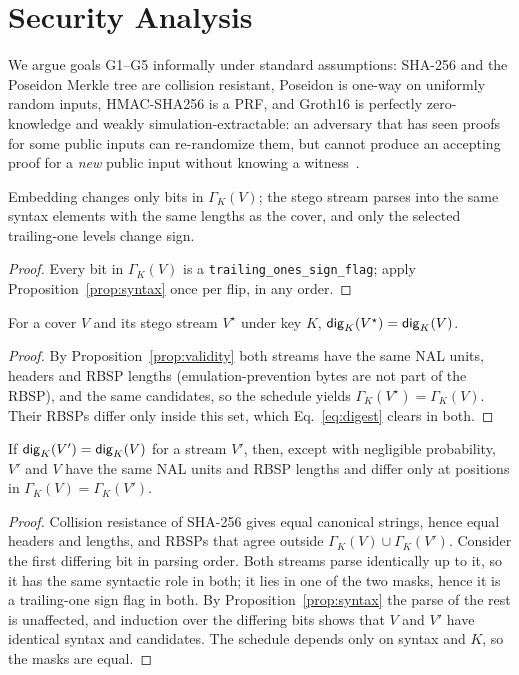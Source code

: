 \section{Security Analysis}
\label{sec:security}

We argue goals G1--G5 informally under standard assumptions: SHA-256 and the Poseidon Merkle tree are collision resistant, Poseidon is one-way on uniformly random inputs, HMAC-SHA256 is a PRF, and Groth16 is perfectly zero-knowledge and weakly simulation-extractable: an adversary that has seen proofs for some public inputs can re-randomize them, but cannot produce an accepting proof for a \emph{new} public input without knowing a witness~\cite{baghery2021groth16}.

\begin{proposition}[Validity, G1]
\label{prop:validity}
Embedding changes only bits in $\Gamma_K(V)$; the stego stream parses into the same syntax elements with the same lengths as the cover, and only the selected trailing-one levels change sign.
\end{proposition}
\begin{proof}
Every bit in $\Gamma_K(V)$ is a \texttt{trailing\_ones\_sign\_flag}; apply Proposition~\ref{prop:syntax} once per flip, in any order.
\end{proof}

\begin{lemma}
\label{lem:invariance}
For a cover $V$ and its stego stream $V^{\star}$ under key $K$, $\mathsf{dig}_K(V^{\star})=\mathsf{dig}_K(V)$.
\end{lemma}
\begin{proof}
By Proposition~\ref{prop:validity} both streams have the same NAL units, headers and RBSP lengths (emulation-prevention bytes are not part of the RBSP), and the same candidates, so the schedule yields $\Gamma_K(V^{\star})=\Gamma_K(V)$. Their RBSPs differ only inside this set, which Eq.~\eqref{eq:digest} clears in both.
\end{proof}

\begin{lemma}
\label{lem:mask}
If $\mathsf{dig}_K(V')=\mathsf{dig}_K(V)$ for a stream $V'$, then, except with negligible probability, $V'$ and $V$ have the same NAL units and RBSP lengths and differ only at positions in $\Gamma_K(V)=\Gamma_K(V')$.
\end{lemma}
\begin{proof}
Collision resistance of SHA-256 gives equal canonical strings, hence equal headers and lengths, and RBSPs that agree outside $\Gamma_K(V)\cup\Gamma_K(V')$. Consider the first differing bit in parsing order. Both streams parse identically up to it, so it has the same syntactic role in both; it lies in one of the two masks, hence it is a trailing-one sign flag in both. By Proposition~\ref{prop:syntax} the parse of the rest is unaffected, and induction over the differing bits shows that $V$ and $V'$ have identical syntax and candidates. The schedule depends only on syntax and $K$, so the masks are equal.
\end{proof}

